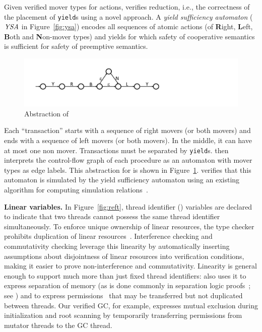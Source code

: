 Given verified mover types for actions, \civl verifies reduction, i.e., the correctness of the placement of {\tt yield}s using a novel  approach.
A {\em yield sufficiency automaton\/} ($\mathit{YSA}$ in Figure~\ref{fig:ysa})
encodes all sequences of atomic actions (of {\bf R}ight, {\bf L}eft,
{\bf B}oth and
{\bf N}on-mover types)  and yields for which safety of cooperative semantics is sufficient 
for safety of preemptive semantics. 
\begin{figure}
\vspace*{-1cm}
\begin{center}
\includegraphics[scale=0.25]{WBSlow.pdf}
\end{center}
\vspace*{-0.5cm}
\caption{Abstraction of }
\label{fig:midwb}
\end{figure}
Each ``transaction'' starts with a sequence of right movers (or both movers) and ends with a sequence of left movers (or both movers).
In the middle, it can have at most one non mover. Transactions must be
separated by {\tt yield}s.
\civl then interprets the control-flow graph of each procedure as an automaton with mover types as edge labels. 
This abstraction for  is shown in Figure~\ref{fig:midwb}.
\civl verifies that this automaton is simulated by the yield sufficiency automaton using an existing algorithm for computing simulation relations~\cite{HenzingerHK95}.

{\bf Linear variables.}
In Figure~\ref{fig:reft}, thread identifier () variables are declared  to indicate that two threads cannot possess the same thread identifier simultaneously.
To enforce unique ownership of linear resources, the \civl type checker prohibits duplication of linear resources~\cite{Wadler90lineartypes}.
Interference checking and commutativity checking leverage this linearity by automatically inserting assumptions about disjointness of linear resources into verification conditions,
making it easier to prove non-interference and commutativity.
Linearity is general enough to support much more than just fixed thread identifiers:
\civl also uses it to express separation of memory (as is done
commonly in separation logic proofs~\cite{Reynolds02}; see \cite{LahiriQW11})
and to express permissions~\cite{boyland:03fractions} that may be transferred but not duplicated between threads.
Our verified GC, for example, expresses mutual exclusion during initialization and root scanning by temporarily transferring permissions from mutator threads to the GC thread.

